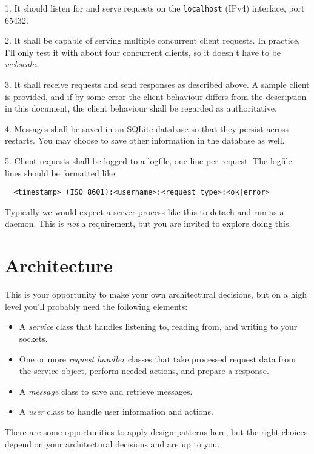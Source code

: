 \documentclass{article}
\begin{document}
1. It should listen for and serve requests on the \texttt{localhost} (IPv4) interface, port 65432.

2. It shall be capable of serving multiple concurrent client requests. In practice, I'll only test it 
with about four concurrent clients, so it doesn't have to be \emph{webscale}.

3. It shall receive requests and send responses as described above. A sample client is provided, and
if by some error the client behaviour differs from the description in this document, the client behaviour
shall be regarded as authoritative.

4. Messages shall be saved in an SQLite database so that they persist across restarts. You may choose to 
save other information in the database as well.

5. Client requests shall be logged to a logfile, one line per request. The logfile lines should be formatted like
\begin{verbatim}
  <timestamp> (ISO 8601):<username>:<request type>:<ok|error>
\end{verbatim}  

Typically we would expect a server process like this to detach and run as a daemon. This is \emph{not} a 
requirement, but you are invited to explore doing this.

\section{Architecture}
This is your opportunity to make your own architectural decisions, but on a high level you'll 
probably need the following elements:

\begin{itemize}
  \item A \emph{service} class that handles listening to, reading from, and writing to your sockets.
  \item One or more \emph{request handler} classes that take processed request data from the service
  object, perform needed actions, and prepare a response.
  \item A \emph{message} class to save and retrieve messages.
  \item A \emph{user} class to handle user information and actions.
\end{itemize}

There are some opportunities to apply design patterns here, but the right choices depend on your architectural decisions and are 
up to you.
\end{document}
